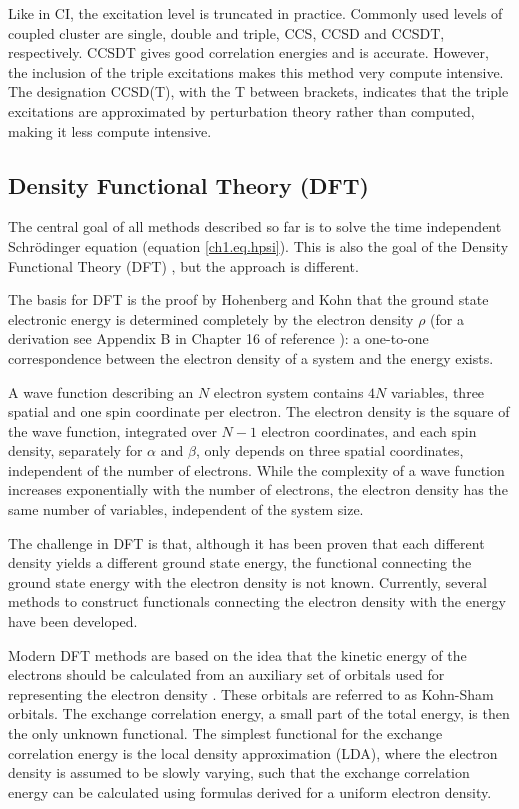 Like in CI, the excitation level is truncated in practice. Commonly used levels of coupled cluster are single, double and triple, CCS, CCSD and CCSDT, respectively. CCSDT gives good correlation energies and is accurate. However, the inclusion of the triple excitations makes this method very compute intensive. The designation CCSD(T), with the T between brackets, indicates that the triple excitations are approximated by perturbation theory rather than computed, making it less compute intensive.

\subsection{Density Functional Theory (DFT)}
The central goal of all methods described so far is to solve the time independent Schr\"{o}dinger equation (equation \ref{ch1.eq.hpsi}). This is also the goal of the Density Functional Theory (DFT) \cite{jensen, hohenberg, kohnsham}, but the approach is different. 

The basis for DFT is the proof by Hohenberg and Kohn \cite{hohenberg} that the ground state electronic energy is determined completely by the electron density $\rho$ (for a derivation see Appendix B in Chapter 16 of reference \cite{jensen}): a one-to-one correspondence between the electron density of a system and the energy exists.

A wave function describing an $N$ electron system contains $4N$ variables, three spatial and one spin coordinate per electron. The electron density is the square of the wave function, integrated over $N - 1$ electron coordinates, and each spin density, separately for $\alpha$ and $\beta$, only depends on three spatial coordinates, independent of the number of electrons. While the complexity of a wave function increases exponentially with the number of electrons, the electron density has the same number of variables, independent of the system size.

The challenge in DFT is that, although it has been proven that each different density yields a different ground state energy, the functional connecting the ground state energy with the electron density is not known. Currently, several methods to construct functionals connecting the electron density with the energy have been developed.

Modern DFT methods are based on the idea that the kinetic energy of the electrons should be calculated from an auxiliary
set of orbitals used for representing the electron density \cite{kohnsham}. These orbitals are referred to as Kohn-Sham orbitals. The exchange correlation energy, a small part of the total energy, is then the only unknown functional. The simplest functional for the exchange correlation energy is the local density approximation (LDA), where the electron density is assumed to be slowly varying, such that the exchange correlation energy can be calculated using formulas derived for a uniform electron density.


